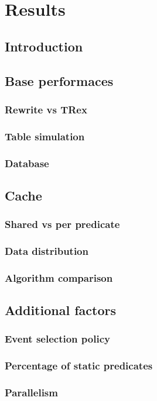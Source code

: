 \chapter{Results}

\section{Introduction}

\section{Base performaces}
\subsection{Rewrite vs TRex}
\subsection{Table simulation}
\subsection{Database}

\section{Cache}
\subsection{Shared vs per predicate}
\subsection{Data distribution}
\subsection{Algorithm comparison}

\section{Additional factors}
\subsection{Event selection policy}
\subsection{Percentage of static predicates}
\subsection{Parallelism}
